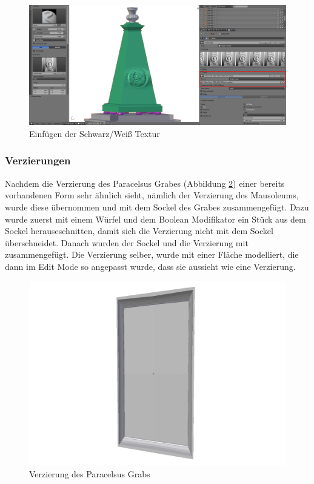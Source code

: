 \begin{figure}[H]
    \centering
    \includegraphics[width=.8\textwidth]{images/Paracelsus-Grab_Brush.png}
    \caption{Einfügen der Schwarz/Weiß Textur}
    \label{Paracelsus_Grab:image4}
\end{figure}

\subsubsection{Verzierungen}
Nachdem die Verzierung des Paracelsus Grabes (Abbildung \ref{Paracelsus_Grab:image3}) einer bereits vorhandenen Form sehr ähnlich sieht, nämlich der Verzierung des Mausoleums, wurde diese übernommen und
mit dem Sockel des Grabes zusammengefügt. Dazu wurde zuerst mit einem Würfel und dem Boolean Modifikator ein Stück aus dem Sockel herauseschnitten, damit
sich die Verzierung nicht mit dem Sockel überschneidet. Danach wurden der Sockel und die Verzierung mit  zusammengefügt. Die Verzierung selber, wurde mit einer
Fläche modelliert, die dann im Edit Mode so angepasst wurde, dass sie aussieht wie eine Verzierung.
\begin{figure}[H]
    \centering
    \includegraphics[width=.8\textwidth]{images/Paracelsus-Grab_Verzierung.png}
    \caption{Verzierung des Paracelsus Grabs}
    \label{Paracelsus_Grab:image3}
\end{figure}

